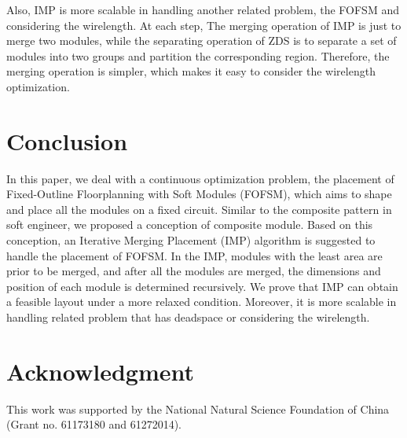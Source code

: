 \documentclass[conference]{IEEEtran}
\begin{document}
Also, IMP is more scalable in handling another related problem, the FOFSM and considering the wirelength. At each step, The merging operation of IMP is just to merge two modules, while the separating operation of ZDS is to separate a set of modules into two groups and partition the corresponding region. Therefore, the merging operation is simpler, which makes it easy to consider the wirelength optimization.


\section{Conclusion}

In this paper, we deal with a continuous optimization problem, the placement of Fixed-Outline Floorplanning with Soft Modules (FOFSM), which aims to shape and place all the modules on a fixed circuit. Similar to the composite pattern in soft engineer, we proposed a conception of composite module. Based on this conception, an Iterative Merging Placement (IMP) algorithm is suggested to handle the placement of FOFSM. In the IMP, modules with the least area are prior to be merged, and after all the modules are merged, the dimensions and position of each module is determined recursively. We prove that IMP can obtain a feasible layout under a more relaxed condition. Moreover, it is more scalable in handling related problem that has deadspace or considering the wirelength.






\section*{Acknowledgment}


This work was supported by the National Natural Science Foundation of China (Grant no. 61173180 and 61272014).









\end{document}
